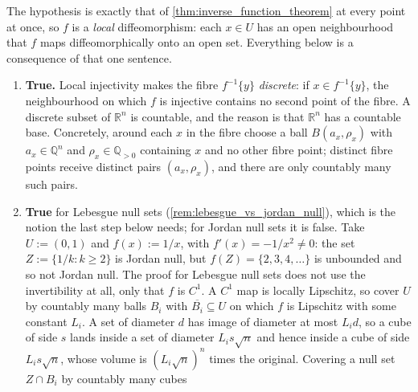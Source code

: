 \begin{exercisesolution}
\label{sol:local_diffeomorphism_four_consequences}
The hypothesis is exactly that of \cref{thm:inverse_function_theorem} at every point at once, so
$f$ is a \emph{local} diffeomorphism: each $x \in U$ has an open neighbourhood that $f$ maps
diffeomorphically onto an open set. Everything below is a consequence of that one sentence.
\begin{enumerate}[label=\textbf{(\alph*)}]
  \item \textbf{True.} Local injectivity makes the fibre $f^{-1}\{y\}$ \emph{discrete}: if
    $x \in f^{-1}\{y\}$, the neighbourhood on which $f$ is injective contains no second point of
    the fibre. A discrete subset of $\mathbb{R}^n$ is countable, and the reason is that
    $\mathbb{R}^n$ has a countable base. Concretely, around each $x$ in the fibre choose a ball
    $B(a_x,\rho_x)$ with $a_x \in \mathbb{Q}^n$ and $\rho_x \in \mathbb{Q}_{>0}$ containing $x$
    and no other fibre point; distinct fibre points receive distinct pairs $(a_x,\rho_x)$, and
    there are only countably many such pairs.
  \item \textbf{True} for Lebesgue null sets (\cref{rem:lebesgue_vs_jordan_null}), which is the
    notion the last step below needs; for Jordan null sets it is false. Take $U := (0,1)$ and
    $f(x) := 1/x$, with $f'(x) = -1/x^2 \neq 0$: the set $Z := \{1/k : k \geq 2\}$ is Jordan
    null, but $f(Z) = \{2,3,4,\dots\}$ is unbounded and so not Jordan null. The proof for
    Lebesgue null sets does not use the invertibility at all, only that $f$ is $C^1$. A $C^1$ map is locally Lipschitz, so cover $U$ by countably many balls $B_i$
    with $\overline{B_i} \subseteq U$ on which $f$ is Lipschitz with some constant $L_i$. A set of diameter $d$ has
    image of diameter at most $L_id$, so a cube of side $s$ lands inside a set of diameter
    $L_i s\sqrt n$ and hence inside a cube of side $L_i s\sqrt n$, whose volume is
    $(L_i\sqrt n)^n$ times the original. Covering a null set $Z \cap B_i$ by countably many cubes

\end{enumerate}
\end{exercisesolution}
